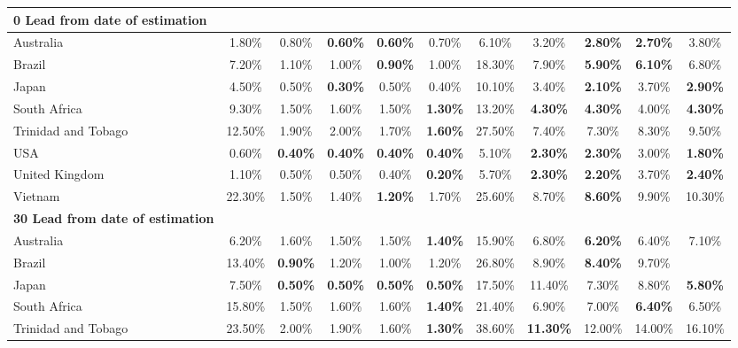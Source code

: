 \begin{table}[!ht]
\begin{adjustbox}{max width=\textwidth}
\begin{tabular}{|l|c|c|c|c|c|c|c|c|c|c|}
        \textbf{0 Lead from date of estimation}& ~ & ~ & ~ & ~ & ~ & ~ & ~ & ~ & ~ & ~ \\ \hline
        Australia & 1.80\% & 0.80\% & \textbf{0.60\%} & \textbf{0.60\%} & 0.70\% & 6.10\% & 3.20\% & \textbf{2.80\%} & \textbf{2.70\%} & 3.80\% \\ \hline
        Brazil & 7.20\% & 1.10\% & 1.00\% & \textbf{0.90\%} & 1.00\% & 18.30\% & 7.90\% & \textbf{5.90\%} & \textbf{6.10\%} & 6.80\% \\ \hline
        Japan & 4.50\% & 0.50\% & \textbf{0.30\%} & 0.50\% & 0.40\% & 10.10\% & 3.40\% & \textbf{2.10\%} & 3.70\% & \textbf{2.90\%} \\ \hline
        South Africa & 9.30\% & 1.50\% & 1.60\% & 1.50\% & \textbf{1.30\%} & 13.20\% & \textbf{4.30\%} & \textbf{4.30\%} & 4.00\% & \textbf{4.30\%} \\ \hline
        Trinidad and Tobago & 12.50\% & 1.90\% & 2.00\% & 1.70\% & \textbf{1.60\%} & 27.50\% & 7.40\% & 7.30\% & 8.30\% & 9.50\% \\ \hline
        USA & 0.60\% & \textbf{0.40\%} & \textbf{0.40\%} & \textbf{0.40\%} & \textbf{0.40\%} & 5.10\% & \textbf{2.30\%} & \textbf{2.30\%} & 3.00\% & \textbf{1.80\%} \\ \hline
        United Kingdom & 1.10\% & 0.50\% & 0.50\% & 0.40\% & \textbf{0.20\%} & 5.70\% & \textbf{2.30\%} & \textbf{2.20\%} & 3.70\% & \textbf{2.40\%} \\ \hline
        Vietnam & 22.30\% & 1.50\% & 1.40\% & \textbf{1.20\%} & 1.70\% & 25.60\% & 8.70\% & \textbf{8.60\%} & 9.90\% & 10.30\% \\ \hline
		\textbf{30 Lead from date of estimation} & ~ & ~ & ~ & ~ & ~ & ~ & ~ & ~ & ~ & ~ \\ \hline
        Australia & 6.20\% & 1.60\% & 1.50\% & 1.50\% & \textbf{1.40\%} & 15.90\% & 6.80\% & \textbf{6.20\%} & 6.40\% & 7.10\% \\ \hline
        Brazil & 13.40\% & \textbf{0.90\%} & 1.20\% & 1.00\% & 1.20\% & 26.80\% & 8.90\% & \textbf{8.40\%} & 9.70\% \\ \hline
        Japan & 7.50\% & \textbf{0.50\%} & \textbf{0.50\%} & \textbf{0.50\%} & \textbf{0.50\%} & 17.50\% & 11.40\% & 7.30\% & 8.80\% & \textbf{5.80\%} \\ \hline
        South Africa & 15.80\% & 1.50\% & 1.60\% & 1.60\% & \textbf{1.40\%} & 21.40\% & 6.90\% & 7.00\% & \textbf{6.40\%} & 6.50\% \\ \hline
        Trinidad and Tobago & 23.50\% & 2.00\% & 1.90\% & 1.60\% & \textbf{1.30\%} & 38.60\% & \textbf{11.30\%} & 12.00\% & 14.00\% & 16.10\% \\ \hline

\end{tabular}
\end{adjustbox}
\end{table}
